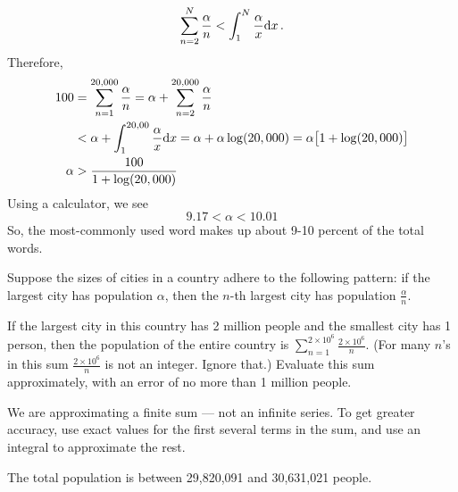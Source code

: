 \begin{solution}
	\[ \sum_{n=2}^N \frac{\alpha}{n}< \int_1^{N} \frac{\alpha}{x}\mathrm{d}x\,.\]
	Therefore,
	\begin{align*}
	100&= \sum_{n=1}^{20,000} \frac{\alpha}{n}= \alpha+\sum_{n=2}^{20,000} \frac{\alpha}{n}\\
	&<\alpha+\int_1^{20,00} \frac{\alpha}{x}\mathrm{d}x=\alpha+\alpha\log(20,000)=\alpha\big[1+\log(20,000)\big]\\
	\alpha&>\frac{100}{1+\log(20,000)}
	\end{align*}
	Using a calculator, we see
	\[9.17 < \alpha < 10.01\]
	So, the most-commonly used word makes up about 9-10 percent of the total words.
\end{solution}


\begin{question}\label{probs3.2_Zipf2}

	Suppose the sizes of cities in a country adhere to the following pattern: if the largest city has population $\alpha$, then the $n$-th largest city has population $\frac{\alpha}{n}$.

	If the largest city in this country has 2 million people and the smallest city has 1 person, then the population of the entire country is
$\sum_{n=1}^{2 \times 10^6}\frac{2\times 10^6}{n}$. (For many $n$'s in this sum 
$\frac{2\times 10^6}{n}$ is not an integer. Ignore that.)
Evaluate this sum approximately, with an error of no more than 1 million people.

\end{question}
\begin{hint}
	We are approximating a finite sum --- not an infinite series. To get greater accuracy, use exact values for the first several terms in the sum, and use an integral to approximate the rest.
\end{hint}
\begin{answer}
	The total population is between 29,820,091 and 30,631,021 people.
\end{answer}
